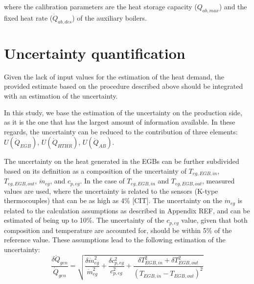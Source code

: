 \documentclass[]{article}
\begin{document}
	\begin{algorithmic}[1]
		\EndWhile
	\end{algorithmic}

where the calibration parameters are the heat storage capacity ($Q_{ab,max}$) and the fixed heat rate ($\dot{Q}_{ab,des}$) of the auxiliary boilers.





\section{Uncertainty quantification}

Given the lack of input values for the estimation of the heat demand, the provided estimate based on the procedure described above should be integrated with an estimation of the uncertainty. 

In this study, we base the estimation of the uncertainty on the production side, as it is the one that has the largest amount of information available. In these regards, the uncertainty can be reduced to the contribution of three elements: $U(\dot{Q}_{EGB})$, $U(\dot{Q}_{HTHR})$, $U(\dot{Q}_{AB})$.

The uncertainty on the heat generated in the EGBs can be further subdivided based on its definition as a composition of the uncertainty of $T_{eg,EGB,in}$, $T_{eg,EGB,out}$, $\dot{m}_{eg}$, and $c_{p,eg}$. In the case of $T_{eg,EGB,in}$ and $T_{eg,EGB,out}$, measured values are used, where the uncertainty is related to the sensors (K-type thermocouples) that can be as high as 4\% [CIT]. The uncertainty on the $\dot{m}_{eg}$ is related to the calculation assumptions as described in Appendix REF, and can be estimated of being up to 10\%. The uncertainty of the $c_{p,eg}$ value, given that both composition and temperature are accounted for, should be within 5\% of the reference value. These assumptions lead to the following estimation of the uncertainty:
\begin{equation}
\frac{\delta \dot{Q}_{gen}}{\dot{Q}_{gen}} = \sqrt{\frac{\delta \dot{m}_{eg}^2}{\dot{m}_{eg}^2} + \frac{\delta c_{p,eg}^2}{c_{p,eg}^2} + \frac{\delta T_{EGB,in}^2 + \delta T_{EGB,out}^2}{(T_{EGB,in} - T_{EGB,out})^2}}
\end{equation}
\end{document}
